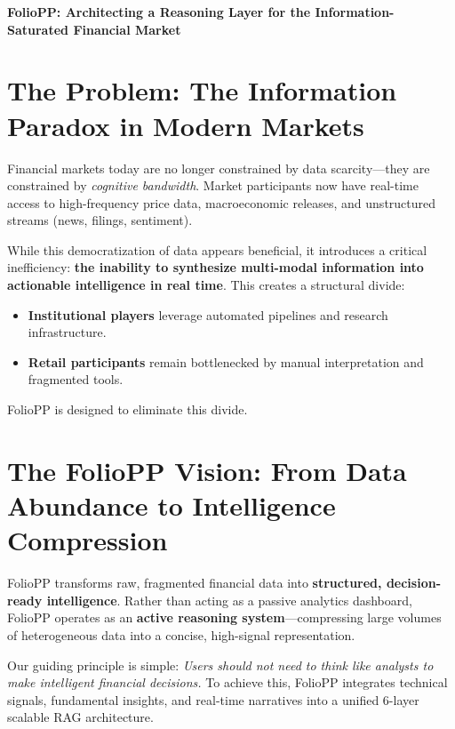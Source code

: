 \documentclass[13pt,a4paper]{article}
\begin{document}
\begin{center}
    {\Huge \textbf{FolioPP: Architecting a Reasoning Layer for the Information-Saturated Financial Market} \par}
\end{center}
\vspace{2em}

\onehalfspacing

\section{The Problem: The Information Paradox in Modern Markets}
Financial markets today are no longer constrained by data scarcity—they are constrained by \textit{cognitive bandwidth}. Market participants now have real-time access to high-frequency price data, macroeconomic releases, and unstructured streams (news, filings, sentiment).

While this democratization of data appears beneficial, it introduces a critical inefficiency: \textbf{the inability to synthesize multi-modal information into actionable intelligence in real time}. This creates a structural divide:
\begin{itemize}
    \item \textbf{Institutional players} leverage automated pipelines and research infrastructure.
    \item \textbf{Retail participants} remain bottlenecked by manual interpretation and fragmented tools.
\end{itemize}

FolioPP is designed to eliminate this divide.

\section{The FolioPP Vision: From Data Abundance to Intelligence Compression}
FolioPP transforms raw, fragmented financial data into \textbf{structured, decision-ready intelligence}. Rather than acting as a passive analytics dashboard, FolioPP operates as an \textbf{active reasoning system}—compressing large volumes of heterogeneous data into a concise, high-signal representation.

Our guiding principle is simple: \textit{Users should not need to think like analysts to make intelligent financial decisions.} To achieve this, FolioPP integrates technical signals, fundamental insights, and real-time narratives into a unified 6-layer scalable RAG architecture.
\end{document}
